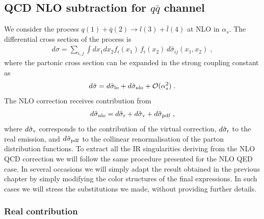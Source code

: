 \documentclass[12pt,a4paper]{article}
\newcommand{\beq}{\begin{eqnarray}}
\newcommand{\eeq}{\end{eqnarray}}
\newcommand{\barq}{{\bar{q}}}
\begin{document}
\subsection{QCD NLO subtraction for $q \barq$ channel }
We consider the process $q(1) +\bar{q}(2) \rightarrow l(3)+\bar{l}(4)$ at NLO in $\alpha_s$. The differential cross section of the process is
\beq
d\sigma= \sum_{i,j} \int dx_1 dx_2 f_i(x_1) \, f_i(x_2) \, d\hat{\sigma}_{ij}(x_1, x_2) \; ,
\eeq
where the partonic cross section can be expanded in the strong coupling constant as
\beq
d\hat{\sigma}= d\hat{\sigma}_{\rm lo}+d\hat{\sigma}_{\rm nlo}+\mathcal{O}(\alpha_s^2) \; .
\eeq
The NLO correction receives contribution from
\beq
d\hat{\sigma}_{\rm nlo}=d\hat{\sigma}_{\rm r}+d\hat{\sigma}_{\rm v}+d\hat{\sigma}_{\rm pdf} \; ,
\eeq
where $d\hat{\sigma}_{\rm v}$ corresponds to the contribution of the virtual correction, $d\hat{\sigma}_{\rm r}$ to the real emission, and $d\hat{\sigma}_{\rm pdf}$ to the collinear renormalisation of the parton distribution functions. To extract all the IR singularities deriving from the NLO QCD correction we will follow the same procedure presented for the NLO QED case. In several occasions we will simply adapt the result obtained in the previous chapter by simply modifying the color structures of the final expressions. In such cases we will stress the substitutions we made, without providing further details. 


\subsubsection{Real contribution}
\end{document}
